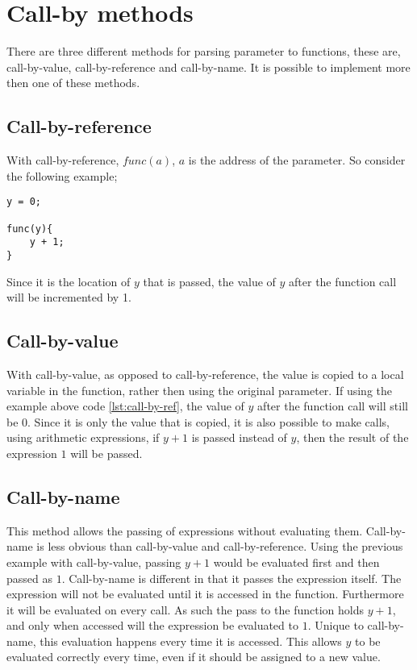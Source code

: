 \section{Call-by methods}
There are three different methods for parsing parameter to functions, these are, call-by-value, call-by-reference and call-by-name. It is possible to implement more then one of these methods.
\subsection*{Call-by-reference}
With call-by-reference, $func(a)$, $a$ is the address of the parameter. So consider the following example;
\begin{lstlisting}[caption=call-by-reference example, label=lst:call-by-ref]
y = 0;

func(y){
	y + 1;
}
\end{lstlisting}
Since it is the location of $y$ that is passed, the value of $y$ after the function call will be incremented by 1.
\subsection*{Call-by-value}
With call-by-value, as opposed to call-by-reference, the value is copied to a local variable in the function, rather then using the original parameter. If using the example above code \ref{lst:call-by-ref}, the value of $y$ after the function call will still be $0$. Since it is only the value that  is copied, it is also possible to make calls, using arithmetic expressions, if $y+1$ is passed instead of $y$, then the result of the expression $1$ will be passed.
\subsection*{Call-by-name}
This method allows the passing of expressions without evaluating them. Call-by-name is less obvious than call-by-value and call-by-reference. Using the previous example with call-by-value, passing $y+1$ would be evaluated first and then passed as $1$. Call-by-name is different in that it passes the expression itself. The expression will not be evaluated until it is accessed in the function. Furthermore it will be evaluated on every call. As such the pass to the function holds $y+1$, and only when accessed will the expression be evaluated to $1$. Unique to call-by-name, this evaluation happens every time it is accessed. This allows $y$ to be evaluated correctly every time, even if it should be assigned to a new value.
